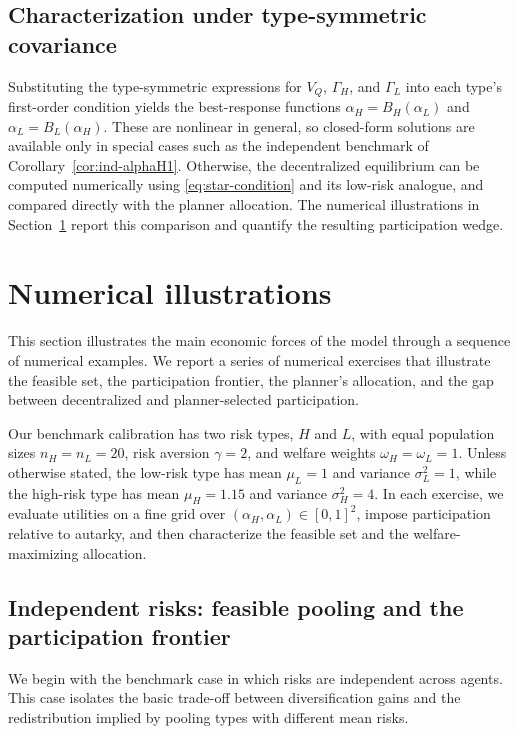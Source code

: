 \documentclass[a4paper,12pt]{article}
\theoremstyle{definition}
\theoremstyle{remark}
\newcommand{\1}{\mathbf{1}}
\begin{document}
\subsection{Characterization under type-symmetric covariance}

Substituting the type-symmetric expressions for \(V_Q\), \(\Gamma_H\), and
\(\Gamma_L\) into each type's first-order condition yields the best-response
functions \(\alpha_H=B_H(\alpha_L)\) and \(\alpha_L=B_L(\alpha_H)\). These are
nonlinear in general, so closed-form solutions are available only in special
cases such as the independent benchmark of
Corollary~\ref{cor:ind-alphaH1}. Otherwise, the decentralized equilibrium can
be computed numerically using \eqref{eq:star-condition} and its low-risk
analogue, and compared directly with the planner allocation. The numerical
illustrations in Section~\ref{sec:numerical} report this comparison and
quantify the resulting participation wedge.


\section{Numerical illustrations}\label{sec:numerical}

This section illustrates the main economic forces of the model through a sequence of numerical examples. We report a series of numerical exercises that illustrate the feasible set, the participation frontier, the planner's allocation, and the gap between decentralized and planner-selected participation.

Our benchmark calibration has two risk types, \(H\) and \(L\), with equal population sizes \(n_H=n_L=20\), risk aversion \(\gamma=2\), and welfare weights \(\omega_H=\omega_L=1\). Unless otherwise stated, the low-risk type has mean \(\mu_L=1\) and variance \(\sigma_L^2=1\), while the high-risk type has mean \(\mu_H=1.15\) and variance \(\sigma_H^2=4\). In each exercise, we evaluate utilities on a fine grid over \((\alpha_H,\alpha_L)\in[0,1]^2\), impose participation relative to autarky, and then characterize the feasible set and the welfare-maximizing allocation.

\subsection{Independent risks: feasible pooling and the participation frontier}

We begin with the benchmark case in which risks are independent across agents. This case isolates the basic trade-off between diversification gains and the redistribution implied by pooling types with different mean risks.
\end{document}
